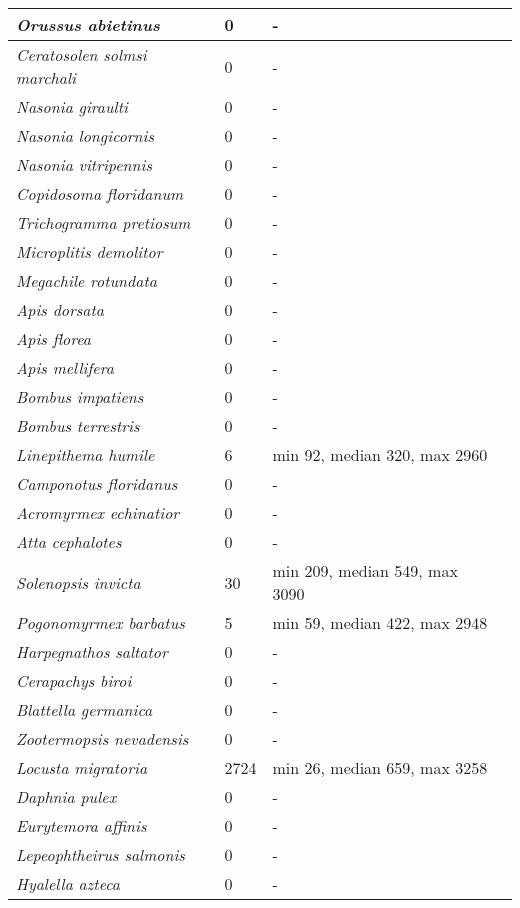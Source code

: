 {\begin{longtable}{| L{4cm} | L{2cm}  | L{5cm} | L{4cm} |}
\textit{Orussus abietinus} & 0 & - & \\ \hline
\textit{Ceratosolen solmsi marchali} & 0 & - & \\ \hline
\textit{Nasonia giraulti} & 0 & - & \\ \hline
\textit{Nasonia longicornis} & 0 & - & \\ \hline
\textit{Nasonia vitripennis} & 0 & - & \\ \hline
\textit{Copidosoma floridanum} & 0 & - & \\ \hline
\textit{Trichogramma pretiosum} & 0 & - & \\ \hline
\textit{Microplitis demolitor} & 0 & - & \\ \hline
\textit{Megachile rotundata} & 0 & - & \\ \hline
\textit{Apis dorsata} & 0 & - & \\ \hline
\textit{Apis florea} & 0 & - & \\ \hline
\textit{Apis mellifera} & 0 & - & \\ \hline
\textit{Bombus impatiens} & 0 & - & \\ \hline
\textit{Bombus terrestris} & 0 & - & \\ \hline
\textit{Linepithema humile} & 6 & min 92, median 320, max 2960 & \\ \hline
\textit{Camponotus floridanus} & 0 & - & \\ \hline
\textit{Acromyrmex echinatior} & 0 & - & \\ \hline
\textit{Atta cephalotes} & 0 & - & \\ \hline
\textit{Solenopsis invicta} & 30 & min 209, median 549, max 3090 & \\ \hline
\textit{Pogonomyrmex barbatus} & 5 & min 59, median 422, max 2948 & \\ \hline
\textit{Harpegnathos saltator} & 0 & - & \\ \hline
\textit{Cerapachys biroi} & 0 & - & \\ \hline
\textit{Blattella germanica} & 0 & - & \\ \hline
\textit{Zootermopsis nevadensis} & 0 & - & \\ \hline
\textit{Locusta migratoria} & 2724 & min 26, median 659, max 3258 & \\ \hline
\textit{Daphnia pulex} & 0 & - & \\ \hline
\textit{Eurytemora affinis} & 0 & - & \\ \hline
\textit{Lepeophtheirus salmonis} & 0 & - & \\ \hline
\textit{Hyalella azteca} & 0 & - & \\ \hline

\end{longtable}}

